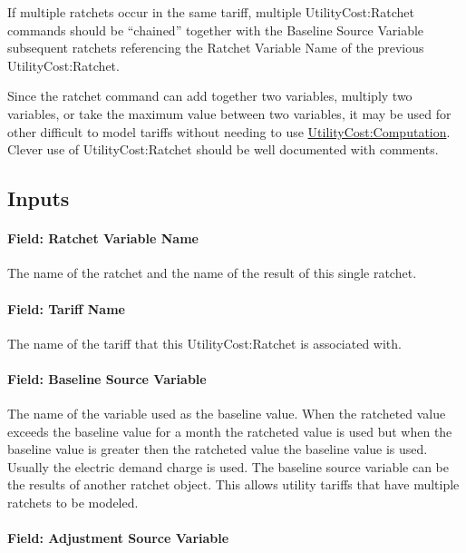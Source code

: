 If multiple ratchets occur in the same tariff, multiple UtilityCost:Ratchet commands should be ``chained'' together with the Baseline Source Variable subsequent ratchets referencing the Ratchet Variable Name of the previous UtilityCost:Ratchet.

Since the ratchet command can add together two variables, multiply two variables, or take the maximum value between two variables, it may be used for other difficult to model tariffs without needing to use \hyperref[utilitycostcomputation]{UtilityCost:Computation}. Clever use of UtilityCost:Ratchet should be well documented with comments.

\subsection{Inputs}\label{inputs-071}

\paragraph{Field: Ratchet Variable Name}\label{field-ratchet-variable-name}

The name of the ratchet and the name of the result of this single ratchet.

\paragraph{Field: Tariff Name}\label{field-tariff-name-003}

The name of the tariff that this UtilityCost:Ratchet is associated with.

\paragraph{Field: Baseline Source Variable}\label{field-baseline-source-variable}

The name of the variable used as the baseline value. When the ratcheted value exceeds the baseline value for a month the ratcheted value is used but when the baseline value is greater then the ratcheted value the baseline value is used. Usually the electric demand charge is used. The baseline source variable can be the results of another ratchet object. This allows utility tariffs that have multiple ratchets to be modeled.

\paragraph{Field: Adjustment Source Variable}\label{field-adjustment-source-variable}

